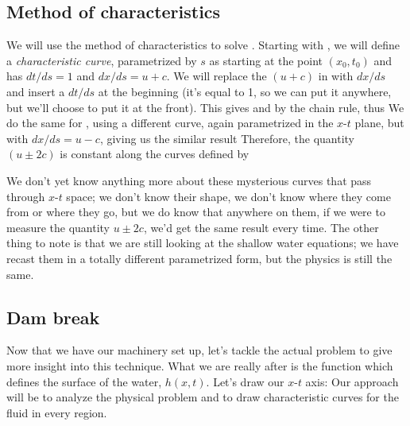 \documentclass[12pt]{book}
\renewcommand{\and}{{\xspace \mathrm{and}\xspace}}
\begin{document}
\subsection{Method of characteristics}
We will use the method of characteristics to solve .  Starting with , we will define a \textit{characteristic curve}, parametrized by $s$ as
\unnumeq{x = x(s)   \qquad\and\qquad   t=t(s)} starting at the point $(x_0\comma t_0)$ and has $dt/ds = 1$ and $dx/ds = u+c$.  We will replace the $(u+c)$ in  with $dx/ds$ and insert a $dt/ds$ at the beginning (it's equal to 1, so we can put it anywhere, but we'll choose to put it at the front).  This gives
and by the chain rule,
thus 
  We do the same for , using a different curve, again parametrized in the $x$-$t$ plane, but with $dx/ds=u-c$, giving us the similar result 
  Therefore, the quantity $(u\pm2c)$ is constant along the curves defined by  

We don't yet know anything more about these mysterious curves that pass through $x$-$t$ space; we don't know their shape, we don't know where they come from or where they go, but we do know that anywhere on them, if we were to measure the quantity $u\pm 2c$, we'd get the same result every time.  The other thing to note is that we are still looking at the shallow water equations; we have recast them in a totally different parametrized form, but the physics is still the same. \\

\clearpage



\newcommand{\charfigsize}{0.45}
\subsection{Dam break}
Now that we have our machinery set up, let's tackle the actual problem to give more insight into this technique.  What we are really after is the function which defines the surface of the water, $h(x,t)$. Let's draw our $x$-$t$ axis:
\insertfigure{fig/ch8/moc01.eps}{\charfigsize}
Our approach will be to analyze the physical problem and to draw characteristic curves for the fluid in every region.
\end{document}
